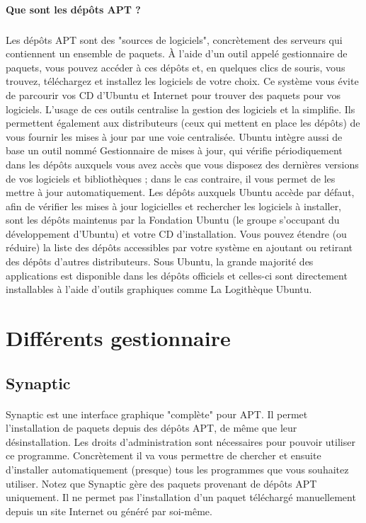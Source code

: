 \documentclass[a4paper,10pt]{article}
\begin{document}
\paragraph{Que sont les dépôts APT ?}
\subparagraph{}
Les dépôts APT sont des "sources de logiciels", concrètement des serveurs qui contiennent un ensemble de paquets. À l'aide d'un outil appelé gestionnaire de paquets, vous pouvez accéder à ces dépôts et, 
en quelques clics de souris, vous trouvez, téléchargez et installez les logiciels de votre choix.
Ce système vous évite de parcourir vos CD d'Ubuntu et Internet pour trouver des paquets pour vos logiciels.
L'usage de ces outils centralise la gestion des logiciels et la simplifie. Ils permettent également aux distributeurs (ceux qui mettent en place les dépôts) de vous fournir les mises à jour par une voie centralisée.
Ubuntu intègre aussi de base un outil nommé Gestionnaire de mises à jour, qui vérifie périodiquement dans les dépôts auxquels vous avez accès que vous disposez des dernières versions de vos logiciels et bibliothèques ;
dans le cas contraire, il vous permet de les mettre à jour automatiquement.
Les dépôts auxquels Ubuntu accède par défaut, afin de vérifier les mises à jour logicielles et rechercher les logiciels à installer, sont les dépôts maintenus par la Fondation Ubuntu 
(le groupe s'occupant du développement d'Ubuntu) et votre CD d'installation. Vous pouvez étendre (ou réduire) la liste des dépôts accessibles par votre système en ajoutant ou retirant des dépôts d'autres distributeurs. 
Sous Ubuntu, la grande majorité des applications est disponible dans les dépôts officiels et celles-ci sont directement installables à l'aide d'outils graphiques comme La Logithèque Ubuntu.



\section{Différents gestionnaire}
\subsection{Synaptic}
\paragraph{}
Synaptic est une interface graphique "complète" pour APT. Il permet l'installation de paquets depuis des dépôts APT, de même que leur désinstallation. Les droits d'administration sont nécessaires pour pouvoir utiliser ce programme.
Concrètement il va vous permettre de chercher et ensuite d'installer automatiquement (presque) tous les programmes que vous souhaitez utiliser. Notez que Synaptic gère des paquets ​provenant de dépôts APT uniquement. Il ne permet ​pas
l'​installation d'un paquet téléchargé manuellement depuis un site Internet ou généré par soi-même. ​
\end{document}

